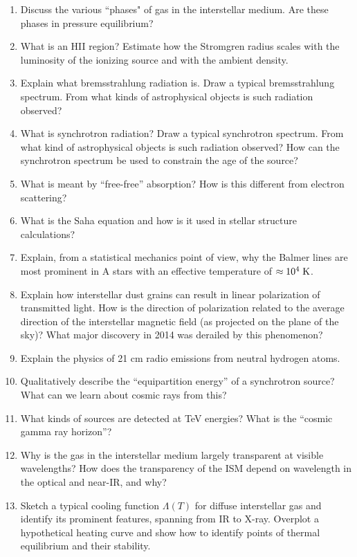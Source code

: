 \documentclass[11pt, oneside]{book}
\begin{document}
\begin{enumerate}[start=72, itemsep=0.4cm]
    \item Discuss the various ``phases" of gas in the interstellar medium. Are these phases in pressure equilibrium?
    \item What is an HII region? Estimate how the Stromgren radius scales with the luminosity of the ionizing source and with the ambient density.
    \item Explain what bremsstrahlung radiation is. Draw a typical bremsstrahlung spectrum. From what kinds of astrophysical objects is such radiation observed?
    \item What is synchrotron radiation? Draw a typical synchrotron spectrum. From what kind of astrophysical objects is such radiation observed? How can the synchrotron spectrum be used to constrain the age of the source?
    \item What is meant by ``free-free'' absorption? How is this different from electron scattering?
    \item What is the Saha equation and how is it used in stellar structure calculations?
    \item Explain, from a statistical mechanics point of view, why the Balmer lines are most prominent in A stars with an effective temperature of $\approx 10^{4} \; {\rm K}$.
    \item Explain how interstellar dust grains can result in linear polarization of transmitted light. How is the direction of polarization related to the average direction of the interstellar magnetic field (as projected on the plane of the sky)? What major discovery in 2014 was derailed by this phenomenon?
    \item Explain the physics of 21 cm radio emissions from neutral hydrogen atoms.
    \item Qualitatively describe the ``equipartition energy'' of a synchrotron source? What can we learn about cosmic rays from this?
    \item What kinds of sources are detected at TeV energies? What is the ``cosmic gamma ray horizon''?
    \item Why is the gas in the interstellar medium largely transparent at visible wavelengths? How does the transparency of the ISM depend on wavelength in the optical and near-IR, and why?
    \item Sketch a typical cooling function $\Lambda(T)$ for diffuse interstellar gas and identify its prominent features, spanning from IR to X-ray. Overplot a hypothetical heating curve and show how to identify points of thermal equilibrium and their stability.

\end{enumerate}
\end{document}
